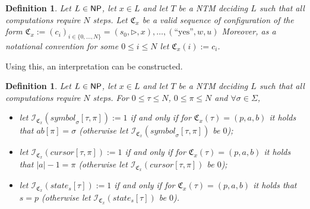 \documentclass [11pt]{article}
\newtheorem{definition}[theorem]{Definition}
\newcommand{\yess}{\mbox{``yes''}}
\newcommand{\ccfont}[1]{\protect\mathsf{#1}}
\newcommand{\NP}{\ccfont{NP}}
\newcommand{\sym}[3]{\textit{symbol}_{#1}[#2,#3]}
\newcommand{\cursor}[2]{\textit{cursor}[#1,#2]}
\newcommand{\state}[2]{\textit{state}_{#1}[#2]}
\newcommand{\sequ}[1]{\mathfrak{C}_{#1}}
\newcommand{\sequint}[2]{ \mathcal{#1}_{\mathfrak{C}_{#2}}}
\begin{document}
 \begin{definition}
 Let $L \in \NP$, let $x \in L$ and let $T$ be a NTM deciding $L$ such that all computations require $N$ steps. Let $\sequ{x}$ be a valid sequence of configuration of the form $\sequ{x}:=(c_i)_{i \in \{ 0,\dots ,N\}}=(s_0,\triangleright,x), \dots , (\yess, w,u)$
Moreover, as a notational convention for some $0\leq i \leq N$ let $\sequ{x}(i):=c_i$.
 \end{definition}
 
% 


 Using this, an interpretation can be constructed.  
 
 \begin{definition}
 Let $L \in \NP$, let $x \in L$ and let $T$ be a NTM deciding $L$ such that all computations require $N$ steps. For $0 \leq \tau \leq N$,  $0 \leq \pi \leq N$ and $\forall \sigma \in \Sigma$,
 \begin{itemize}
 \item let $\sequint{I}{x}(\sym{\sigma}{\tau}{\pi}) := 1$ if and only if for $\sequ{x}(\tau)=(p,a,b)$ it holds that $ab[\pi]=\sigma  $ (otherwise let $\sequint{I}{x}(\sym{\sigma}{\tau}{\pi})$ be $0$);
  \item let $\sequint{I}{x}(\cursor{\tau}{\pi}) := 1$ if and only if for $\sequ{x}(\tau)=(p,a,b)$ it holds that $|a|-1=\pi$ (otherwise let $\sequint{I}{x}(\cursor{\tau}{\pi}) $ be $0$);
   \item let $\sequint{I}{x}(\state{s}{\tau}) := 1$ if and only if for $\sequ{x}(\tau)=(p,a,b)$ it holds that $s=p$ (otherwise let $\sequint{I}{x}(\state{s}{\tau})$ be $0$).
 \end{itemize}
 
 \end{definition}
 
% 
 
\end{document}
